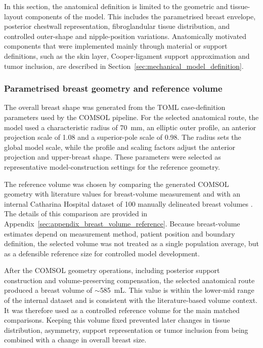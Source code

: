 In this section, the anatomical definition is limited to the geometric and tissue-layout components of the model. This includes the parametrised breast envelope, posterior chestwall representation, fibroglandular tissue distribution, and controlled outer-shape and nipple-position variations. Anatomically motivated components that were implemented mainly through material or support definitions, such as the skin layer, Cooper-ligament support approximation and tumor inclusion, are described in Section~\ref{sec:mechanical_model_definition}.

\subsubsection{Parametrised breast geometry and reference volume}
\label{sec:parametrised_breast_geometry}

The overall breast shape was generated from the TOML case-definition parameters used by the COMSOL pipeline. For the selected anatomical route, the model used a characteristic radius of 70~mm, an elliptic outer profile, an anterior projection scale of 1.08 and a superior-pole scale of 0.98. The radius sets the global model scale, while the profile and scaling factors adjust the anterior projection and upper-breast shape. These parameters were selected as representative model-construction settings for the reference geometry.

The reference volume was chosen by comparing the generated COMSOL geometry with literature values for breast-volume measurement and with an internal Catharina Hospital dataset of 100 manually delineated breast volumes \cite{Stahl2023,Yoo2013,Nie2010SkinRemoval,Choppin2016}. The details of this comparison are provided in Appendix~\ref{sec:appendix_breast_volume_reference}. Because breast-volume estimates depend on measurement method, patient position and boundary definition, the selected volume was not treated as a single population average, but as a defensible reference size for controlled model development.

After the COMSOL geometry operations, including posterior support construction and volume-preserving compensation, the selected anatomical route produced a breast volume of $\sim$585~mL. This value is within the lower-mid range of the internal dataset and is consistent with the literature-based volume context. It was therefore used as a controlled reference volume for the main matched comparisons. Keeping this volume fixed prevented later changes in tissue distribution, asymmetry, support representation or tumor inclusion from being combined with a change in overall breast size.

